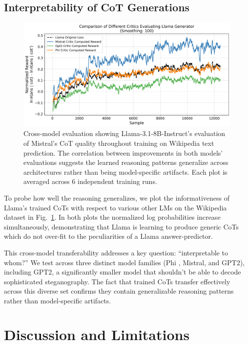 \documentclass[letterpaper]{article} %
\begin{document}
\subsection{Interpretability of CoT Generations}
\label{subsec:interp}

\begin{figure}[ht]
  \centering
  \includegraphics[width=.9\textwidth]{Figures/wiki_multi_critic_comparison.png}
  \caption{Cross-model evaluation showing Llama-3.1-8B-Instruct's evaluation of Mistral's CoT quality throughout training on Wikipedia text prediction. The correlation between improvements in both models' evaluations suggests the learned reasoning patterns generalize across architectures rather than being model-specific artifacts. Each plot is averaged across 6 independent training runs.}
  \label{fig:cross_eval}
\end{figure}

To probe how well the reasoning generalizes, we plot the informativeness of Llama's trained CoTs with respect to various other LMs on the Wikipedia dataset in Fig.~\ref{fig:cross_eval}. In both plots the normalized log probabilities increase simultaneously, demonstrating that Llama is learning to produce generic CoTs which do not over-fit to the peculiarities of a Llama answer-predictor. 

This cross-model transferability addresses a key question: ``interpretable to whom?'' We test across three distinct model families (Phi \citep{abdin2024phi3technicalreporthighly}, Mistral, and GPT2), including GPT2, a significantly smaller model that shouldn't be able to decode sophisticated steganography. The fact that trained CoTs transfer effectively across this diverse set confirms they contain generalizable reasoning patterns rather than model-specific artifacts.

\section{Discussion and Limitations}
\label{sec:disc}
\end{document}
